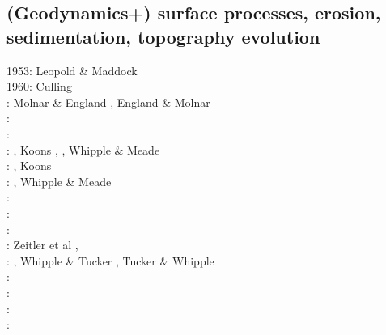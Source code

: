 \subsection{(Geodynamics+) surface processes, erosion, sedimentation, topography evolution}

\begin{scriptsize}
1953: Leopold \& Maddock \cite{lema53}\\
1960: Culling \cite{cull60}\\
\nineteenninety: Molnar \& England \cite{moen90}, England \& Molnar \cite{enmo90}\\
\nineteenninetytwo: \cite{befh92}\cite{chas92}\\
\nineteenninetythree: \cite{povp93}\cite{wibf93}\\
\nineteenninetyfour: \cite{howa94}, Koons \cite{koon94}, \cite{kobe94}\cite{gikb94}, 
                     Whipple \& Meade \cite{whme04}\\
\nineteenninetyfive: \cite{chmm95}, Koons \cite{koon95}\\
\nineteenninetysix: \cite{avbu96}\cite{bekh96}\cite{kobe96},
                     Whipple \& Meade \cite{whme06}\\
\nineteenninetyseven: \cite{brsa97}\cite{gaft97}\cite{babr97}\\
\nineteenninetyeight: \cite{deea98}\cite{vabr98}\\
\nineteenninetynine: \cite{will99a}\cite{bupi99}\cite{babr99}\cite{tobr99}\\
\twothousandone: Zeitler et al \cite{zemk01}, \cite{tulg01}\cite{brsh01}\cite{bupo01}\cite{coul01}\cite{crda01}\cite{moln01}\\
\twothousandtwo: \cite{wibr02}\cite{mobr02}\cite{garc02}, Whipple \& Tucker \cite{whtu02}, 
                 Tucker \& Whipple \cite{tuwh02}\\
\twothousandthree: \cite{brau03}\\
\twothousandfour: \cite{fijj04}\cite{gocl04}\cite{simp04}\cite{skdi04}\\
\twothousandfive: \cite{lave05}\cite{will05}\cite{lahd05}\\
\twothousandsix: \cite{rosw06}\cite{brau06}\cite{bocr06}\cite{simp06}\cite{stwr06}\cite{golc06}\\

\end{scriptsize}
